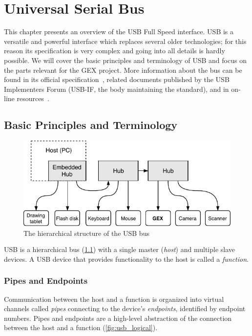 \chapter{Universal Serial Bus}

This chapter presents an overview of the \acrfull{USB} Full Speed interface. \gls{USB} is a versatile and powerful interface which replaces several older technologies; for this reason its specification is very complex and going into all details is hardly possible. We will cover the basic principles and terminology of \gls{USB} and focus on the parts relevant for the GEX project. More information about the bus can be found in its official specification~\cite{usbif-spec}, related documents published by the USB Implementers Forum (USB-IF, the body maintaining the standard), and in on-line resources~\cite{usb-nutshell,usb-made-simple}.

\section{Basic Principles and Terminology}

\begin{figure}[h]
	\centering
	\includegraphics[scale=1] {img/usb-hierarchy-redraw.pdf}
	\caption[USB hierarchical structure]{\label{fig:usb_hierarchy}The hierarchical structure of the USB bus}
\end{figure}

\gls{USB} is a hierarchical bus (\cref{fig:usb_hierarchy}) with a single master (\textit{host}) and multiple slave devices. A \gls{USB} device that provides functionality to the host is called a \textit{function}.%

\subsection{Pipes and Endpoints}

Communication between the host and a function is organized into virtual channels called \textit{pipes} connecting to the device's \textit{endpoints}, identified by endpoint numbers. Pipes and endpoints are a high-level abstraction of the connection between the host and a function (\cref{fig:usb_logical}).

